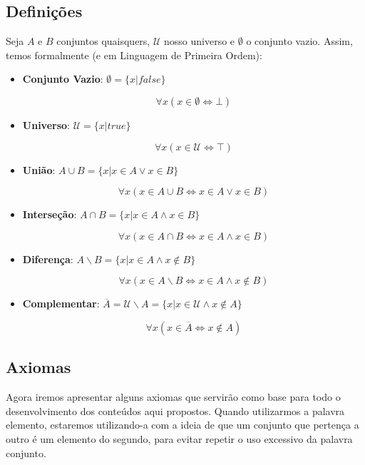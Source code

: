 \subsection{Definições}
  
  Seja $A$ e $B$ conjuntos quaisquers, $\mathcal{U}$ nosso universo e $\emptyset$ o conjunto vazio. Assim, temos formalmente (e em Linguagem de Primeira Ordem):

  \begin{itemize}
    \item \textbf{Conjunto Vazio}: $\emptyset = \{x | false\}$
    
    \[\forall x (x \in \emptyset \iff \bot)\]
    
    \qquad
    
    \item \textbf{Universo}: $\mathcal{U} = \{x | true \}$
    
    \[\forall x (x \in \mathcal{U} \iff \top)\]
    
    \qquad
    
    \item \textbf{União}: $A \cup B = \{x | x \in A \vee x \in B\}$
    
    \[\forall x (x \in A \cup B \iff x \in A \vee x \in B)\]
    
    \qquad
    
    \item \textbf{Interseção}: $A \cap B = \{x | x \in A \wedge x \in B\}$
    
    \[\forall x (x \in A \cap B \iff x \in A \wedge x \in B)\]
    
    \qquad
    
    \item \textbf{Diferença}: $A \backslash B = \{x | x \in A \wedge x \notin B\}$
    
    \[\forall x (x \in A \backslash B \iff x \in A \wedge x \notin B)\]
    
    \qquad
    
    \item \textbf{Complementar}: $\overline A = \mathcal{U} \backslash A = \{x | x \in \mathcal{U} \land x \notin A\}$
    
    \[\forall x (x \in \overline A \iff x \notin A)\]
  \end{itemize} 

  \subsection{Axiomas}
  Agora iremos apresentar alguns axiomas que servirão como base para todo o desenvolvimento dos conteúdos aqui propostos. Quando utilizarmos a palavra elemento, estaremos utilizando-a com a ideia de que um conjunto que pertença a outro é um elemento do segundo, para evitar repetir o uso excessivo da palavra conjunto.

